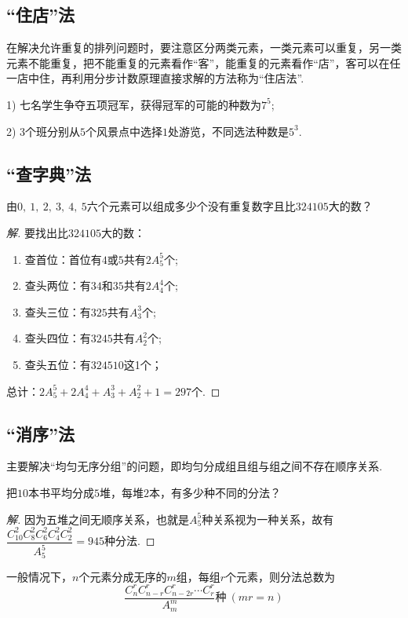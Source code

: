 \documentclass[marginline,noindent,answers,adobefonts]{BHCexam}
\begin{document}
\subsection{“住店”法}
在解决允许重复的排列问题时，要注意区分两类元素，一类元素可以重复，另一类元素不能重复，把不能重复的元素看作“客”，能重复的元素看作“店”，客可以在任一店中住，再利用分步计数原理直接求解的方法称为“住店法”.\par
\begin{example}
1) 七名学生争夺五项冠军，获得冠军的可能的种数为$ 7^5 $;\par
\hspace{1.2em}2) $3$个班分别从$ 5 $个风景点中选择$ 1 $处游览，不同选法种数是$ 5^3 .$
\end{example}
\subsection{   “查字典”法}
\begin{example}
 由$ 0,~1,~2,~3,~4,~5 $六个元素可以组成多少个没有重复数字且比$ 324105 $大的数？
\end{example}
\begin{proof}[解]
要找出比$ 324105 $大的数：
\begin{enumerate}[1)]
\item 查首位：首位有$4$或$5$共有$ 2A_5^5 $个;
\item 查头两位：有$34$和$35$共有$ 2A_4^4 $个;
\item 查头三位：有$ 325 $共有$ A_3^3 $个;
\item 查头四位：有$ 3245 $共有$ A_2^2 $个;
\item 查头五位：有$ 324510 $这1个；
\end{enumerate}
总计：$ 2A_5^5+2A_4^4+A_3^3+A_2^2+1=297 $个.
\end{proof}
\subsection{   “消序”法}
 主要解决“均匀无序分组”的问题，即均匀分成组且组与组之间不存在顺序关系.\par
\begin{example}
把$ 10 $本书平均分成$ 5 $堆，每堆$ 2 $本，有多少种不同的分法？
\end{example}
\begin{proof}[解]
因为五堆之间无顺序关系，也就是$ A_5^5 $种关系视为一种关系，故有$ \dfrac{C_{10}^2C_8^2C_6^2C_4^2C_2^2}{A_5^5}=945 $种分法.
\end{proof}
{\kaishu 一般情况下，$ n $个元素分成无序的$ m $组，每组$ r $个元素，则分法总数为\[\dfrac{C_n^rC_{n-r}^rC_{n-2r}^r\cdots C_r^r}{A_m^m}\text{种}~(mr=n)\]}
\end{document}

